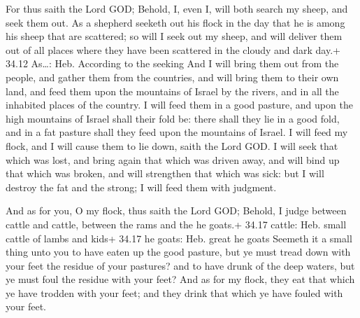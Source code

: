  For thus saith the Lord GOD; Behold, I, even I, will
both search my sheep, and seek them out.  As a shepherd
seeketh out his flock in the day that he is among his sheep that are
scattered; so will I seek out my sheep, and will deliver them out of all
places where they have been scattered in the cloudy and dark day.+ 34.12
As\ldots: Heb. According to the seeking  And I will bring
them out from the people, and gather them from the countries, and will
bring them to their own land, and feed them upon the mountains of Israel
by the rivers, and in all the inhabited places of the country.
 I will feed them in a good pasture, and upon the high
mountains of Israel shall their fold be: there shall they lie in a good
fold, and in a fat pasture shall they feed upon the mountains of Israel.
 I will feed my flock, and I will cause them to lie down,
saith the Lord GOD.  I will seek that which was lost, and
bring again that which was driven away, and will bind up that which was
broken, and will strengthen that which was sick: but I will destroy the
fat and the strong; I will feed them with judgment.

 And as for you, O my flock, thus saith the Lord GOD;
Behold, I judge between cattle and cattle, between the rams and the he
goats.+ 34.17 cattle: Heb. small cattle of lambs and kids+ 34.17 he
goats: Heb. great he goats  Seemeth it a small thing unto
you to have eaten up the good pasture, but ye must tread down with your
feet the residue of your pastures? and to have drunk of the deep waters,
but ye must foul the residue with your feet?  And as for my
flock, they eat that which ye have trodden with your feet; and they
drink that which ye have fouled with your feet.

